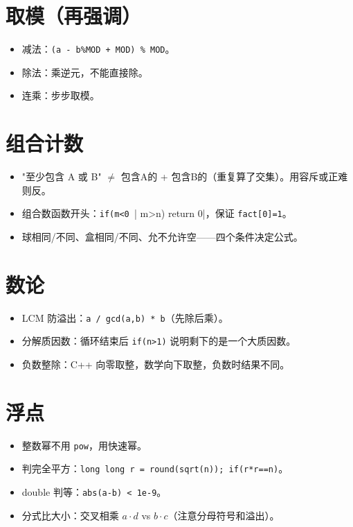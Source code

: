 \documentclass[UTF8,openany,oneside,zihao=-4]{ctexbook}
\begin{document}
\section{取模（再强调）}

\begin{itemize}
  \item 减法：\lstinline|(a - b%MOD + MOD) % MOD|。
  \item 除法：乘逆元，不能直接除。
  \item 连乘：步步取模。
\end{itemize}

\section{组合计数}

\begin{itemize}
  \item "至少包含 A 或 B" $\ne$ 包含A的 + 包含B的（重复算了交集）。用容斥或正难则反。
  \item 组合数函数开头：\lstinline|if(m<0 || m>n) return 0|，保证 \lstinline|fact[0]=1|。
  \item 球相同/不同、盒相同/不同、允不允许空——四个条件决定公式。
\end{itemize}

\section{数论}

\begin{itemize}
  \item LCM 防溢出：\lstinline|a / gcd(a,b) * b|（先除后乘）。
  \item 分解质因数：循环结束后 \lstinline|if(n>1)| 说明剩下的是一个大质因数。
  \item 负数整除：C++ 向零取整，数学向下取整，负数时结果不同。
\end{itemize}

\section{浮点}

\begin{itemize}
  \item 整数幂不用 \lstinline|pow|，用快速幂。
  \item 判完全平方：\lstinline|long long r = round(sqrt(n)); if(r*r==n)|。
  \item double 判等：\lstinline|abs(a-b) < 1e-9|。
  \item 分式比大小：交叉相乘 $a \cdot d$ vs $b \cdot c$（注意分母符号和溢出）。
\end{itemize}
\end{document}
